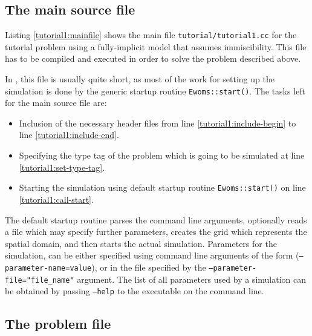 \subsection{The main source file}

Listing \ref{tutorial1:mainfile} shows the main file
\texttt{tutorial/tutorial1.cc} for the tutorial problem using
a fully-implicit model that assumes immiscibility. This file has to be
compiled and executed in order to solve the problem described above.

\begin{lst}\label{tutorial1:mainfile} \mbox{}
  
\end{lst}

In \eWoms, this file is usually quite short, as most of the work for
setting up the simulation is done by the generic startup routine
\texttt{Ewoms::start()}. The tasks left for the main source file are:
\begin{itemize}
\item Inclusion of the necessary header files from line
  \ref{tutorial1:include-begin} to line
  \ref{tutorial1:include-end}.
\item Specifying the type tag of the problem which is going to be
  simulated at line \ref{tutorial1:set-type-tag}.
\item Starting the simulation using default \eWoms startup routine
  \texttt{Ewoms::start()} on line \ref{tutorial1:call-start}.
\end{itemize}

The default \eWoms startup routine parses the command line arguments,
optionally reads a file which may specify further parameters, creates
the grid which represents the spatial domain, and then starts the
actual simulation.  Parameters for the simulation, can be either
specified using command line arguments of the form
(\texttt{--parameter-name=value}), or in the file specified by the
\texttt{--parameter-file="file\_name"} argument. The list of all
parameters used by a simulation can be obtained by passing
\texttt{--help} to the executable on the command line.

\subsection{The problem file}

\begin{lst} \label{tutorial1:problemfile}\mbox{}

\end{lst}

